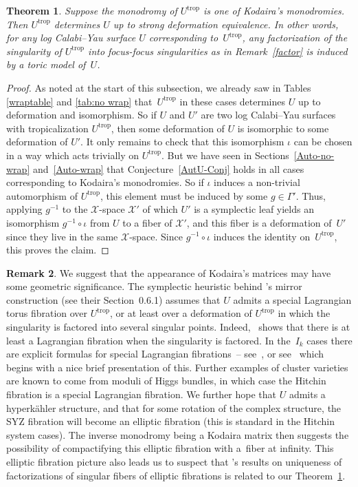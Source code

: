 \documentclass[10pt,a4paper]{amsart}
\numberwithin{equation}{section}
\numberwithin{figure}{section}
\numberwithin{table}{section}
\DeclareMathOperator{\trop}{trop}
\let\s=\mathcal
\newtheorem{thm}{Theorem}[section]
\theoremstyle{definition}
\newtheorem{rmk}[thm]{Remark}
\begin{document}
\begin{thm}\label{sing}Suppose the monodromy of $U^{\trop}$ is one of Kodaira's monodromies. Then $U^{\trop}$ determines $U$ up to strong deformation equivalence. In other words, for any log Calabi--Yau surface $U$ corresponding to~$U^{\trop}$, any factorization of the singularity of $U^{\trop}$ into focus-focus singularities as in Remark~{\rm \ref{factor}} is induced by a toric model of~$U$.
\end{thm}
\begin{proof}As noted at the start of this subsection, we already saw in Tables \ref{wraptable} and \ref{tab:no wrap} that~$U^{\trop}$ in these cases determines $U$ up to deformation and isomorphism. So if $U$ and $U'$ are two log Calabi--Yau surfaces with tropicalization $U^{\trop}$, then some deformation of $U$ is isomorphic to some deformation of $U'$. It only remains to check that this isomorphism $\iota$ can be chosen in a way which acts trivially on $U^{\trop}$. But we have seen in Sections~\ref{Auto-no-wrap} and~\ref{Auto-wrap} that Conjecture~\ref{AutU-Conj} holds in all cases corresponding to Kodaira's monodromies. So if $\iota$ induces a non-trivial automorphism of $U^{\trop}$, this element must be induced by some $g\in \Gamma'$. Thus, applying $g^{-1}$ to the $\s{X}$-space $\s{X}'$ of which $U'$ is a symplectic leaf yields an isomorphism $g^{-1}\circ \iota$ from $U$ to a fiber of $\s{X}'$, and this fiber is a deformation of~$U'$ since they live in the same $\s{X}$-space. Since $g^{-1}\circ \iota$ induces the identity on~$U^{\trop}$, this proves the claim.
\end{proof}

\begin{rmk}We suggest that the appearance of Kodaira's matrices may have some geometric significance. The symplectic heuristic behind \cite{GHK1}'s mirror construction (see their Section~0.6.1) assumes that $U$ admits a special Lagrangian torus fibration over $U^{\trop}$, or at least over a deformation of $U^{\trop}$ in which the singularity is factored into several singular points. Indeed, \cite{Sym}~shows that there is at least a Lagrangian fibration when the singularity is factored. In the~$I_k$ cases there are explicit formulas for special Lagrangian fibrations~-- see~\cite{GrSlag}, or see~\cite{CU} which begins with a nice brief presentation of this. Further examples of cluster varieties are known to come from moduli of Higgs bundles, in which case the Hitchin fibration is a special Lagrangian fibration. We further hope that $U$ admits a hyperk\"{a}hler structure, and that for some rotation of the complex structure, the SYZ fibration will become an elliptic fibration (this is standard in the Hitchin system cases). The inverse monodromy being a Kodaira matrix then suggests the possibility of compactifying this elliptic fibration with a~fiber at infinity. This elliptic fibration picture also leads us to suspect that \cite{CV}'s results on uniqueness of factorizations of singular fibers of elliptic fibrations is related to our Theorem~\ref{sing}.
\end{rmk}
\end{document}
